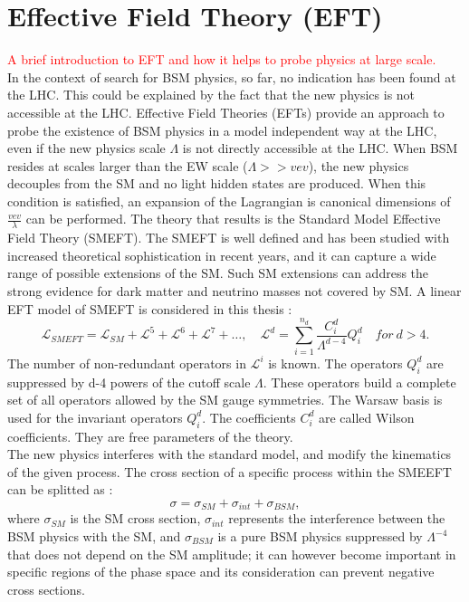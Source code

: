 \section{Effective Field Theory (EFT)}
\label{chap1:EFT}
\textcolor{red}{A brief introduction to EFT and how it helps to probe physics at large scale.\\}
In the context of search for BSM physics, so far, no indication has been found at the LHC. This could be explained by the fact that the new physics is not accessible at the LHC. Effective Field Theories (EFTs) provide an approach to probe the existence of BSM physics in a model independent way at the LHC, even if the new physics scale $\Lambda$ is not directly accessible at the LHC. When BSM resides at scales larger than the EW scale ($\Lambda >> vev$), the new physics decouples from the SM and no light hidden states are produced. When this condition is satisfied, an expansion of the Lagrangian is canonical dimensions of $\frac{vev}{\lambda}$ can be performed. The theory that results is the Standard Model Effective Field Theory (SMEFT). The SMEFT is well defined and has been studied with increased theoretical sophistication in recent years, and it can capture a wide range of possible extensions of the SM. Such SM extensions can address the strong evidence for dark matter and neutrino masses not covered by SM. A linear EFT model of SMEFT is considered in this thesis : 
\begin{equation}
    \mathcal{L}_{S M E F T}=\mathcal{L}_{S M}+\mathcal{L}^{5}+\mathcal{L}^{6}+\mathcal{L}^{7}+\ldots, \quad \mathcal{L}^{d}=\sum_{i=1}^{n_{d}} \frac{C_{i}^{d}}{\Lambda^{d-4}} Q_{i}^{d} \quad for \ d>4.
\end{equation}
The number of non-redundant operators in $\mathcal{L}^i$ is known. The operators $Q_i^d$ are suppressed by d-4 powers of the cutoff scale $\Lambda$. These operators build a complete set of all operators allowed by the SM gauge symmetries. The Warsaw basis is used for the invariant operators $Q_i^d$. The coefficients $C_i^d$ are called Wilson coefficients. They are free parameters of the theory. \\
The new physics interferes with the standard model, and modify the kinematics of the given process. The cross section of a specific process within the SMEEFT can be splitted as : 
\begin{equation}
    \sigma = \sigma_{SM} + \sigma_{int} + \sigma_{BSM},
\end{equation}
where $\sigma_{SM}$ is the SM cross section, $\sigma_{int}$ represents the interference between the BSM physics with the SM, and $\sigma_{BSM}$ is a pure BSM physics suppressed by $\Lambda^{-4}$ that does not depend on the SM amplitude; it can however become important in specific regions of the phase space and its consideration can prevent negative cross sections. \\


